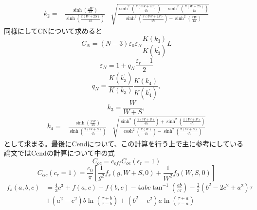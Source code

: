 \begin{equation}
    \begin{aligned}
    k_{2}=& \frac{\sinh \left(\frac{\pi W}{4 h}\right)}{\sinh \left(\frac{\pi(W+2 S)}{4 h}\right)} 
    & \sqrt{\frac{\sinh ^{2}\left(\frac{\pi(3 W+2 S)}{4 h}\right)-\sinh ^{2}\left(\frac{\pi(W+2 S)}{4 h}\right)}{\sinh ^{2}\left(\frac{\pi(3 W+2 S)}{4 h}\right)-\sinh ^{2}\left(\frac{\pi W}{4 h}\right)}}
    \end{aligned}
\end{equation}
同様にしてCNについて求めると
\begin{equation}
    C_{N}=(N-3) \varepsilon_{0} \varepsilon_{N} \frac{K\left(k_{3}\right)}{K\left(k_{3}^{\prime}\right)} L
\end{equation}
\begin{equation}
    \varepsilon_{N}=1+q_{N} \frac{\varepsilon_{r}-1}{2}
\end{equation}
\begin{equation}
    q_{N}=\frac{K\left(k_{3}^{\prime}\right)}{K\left(k_{3}\right)} \frac{K\left(k_{4}\right)}{K\left(k_{4}^{\prime}\right)},
\end{equation}
\begin{equation}
    k_{3}=\frac{W}{W+S},
\end{equation}
\begin{equation}
    \begin{aligned}
    k_{4}=& \frac{\sinh \left(\frac{\pi W}{4 h}\right)}{\sinh \left(\frac{\pi(W+ S)}{4 h}\right)} 
    & \sqrt{\frac{\sinh ^{2}\left(\frac{\pi(W+S)}{4 h}\right)+\sinh ^{2}\left(\frac{\pi(W+ S)}{4 h}\right)}{\cosh ^{2}\left(\frac{\pi(W)}{4 h}\right)-\sinh ^{2}\left(\frac{\pi (W+S)}{4 h}\right)}}
    \end{aligned}
\end{equation}
として求まる。最後にCendについて、この計算を行う上で主に参考にしている論文\cite*{Dib2005}ではCendの計算について\cite*{Dib2001ComprehensiveSO}中の式
\begin{equation}
    C_{o c}=c_{e f f} C_{o e}\left(\epsilon_{r}=1\right)
\end{equation}
\begin{equation}
    \label{Cend}
    C_{\alpha c}\left(c_{r}=1\right)=\frac{c_{0}}{\pi}\left[\frac{1}{g^{2}} f_{s}(g, W+S, 0)+\frac{1}{W^{2}} f_{0}(W, S, 0)\right]
\end{equation}
\begin{equation}
    \label{fs}
    \begin{aligned}
    f_{s}(a, b, c) &=\frac{4}{3} c^{3}+f(a, c)+f(b, c)-4 a b c \tan ^{-1}\left(\frac{a b}{c \tau}\right)-\frac{2}{3}\left(b^{2}-2 c^{2}+a^{2}\right) \tau \\
    &+\left(a^{2}-c^{2}\right) b \ln \left(\frac{\tau+b}{\tau-b}\right)+\left(b^{2}-c^{2}\right) a \ln \left(\frac{\tau+a}{\tau-a}\right)
    \end{aligned}
\end{equation}
